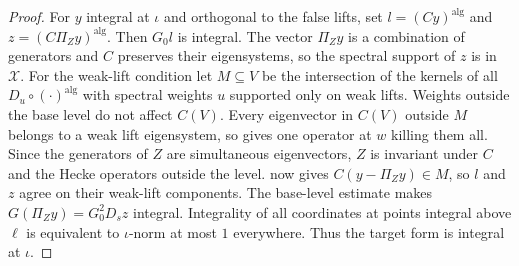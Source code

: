 \begin{proof}
For $y$ integral at $\iota$ and orthogonal to the false lifts, set $l=(Cy)^{\mathrm{alg}}$ and $z=(C\Pi_Zy)^{\mathrm{alg}}$. Then $G_0l$ is integral. The vector $\Pi_Zy$ is a combination of generators and $C$ preserves their eigensystems, so the spectral support of $z$ is in $\mathcal X$. For the weak-lift condition let $M\subseteq V$ be the intersection of the kernels of all $D_u\circ(\cdot)^{\mathrm{alg}}$ with spectral weights $u$ supported only on weak lifts. Weights outside the base level do not affect $C(V)$. Every eigenvector in $C(V)$ outside $M$ belongs to a weak lift eigensystem, so  gives one operator at $w$ killing them all. Since the generators of $Z$ are simultaneous eigenvectors, $Z$ is invariant under $C$ and the Hecke operators outside the level.  now gives $C(y-\Pi_Zy)\in M$, so $l$ and $z$ agree on their weak-lift components. The base-level estimate makes $G(\Pi_Zy)=G_0^2D_s z$ integral. Integrality of all coordinates at points integral above $\ell$ is equivalent to $\iota$-norm at most $1$ everywhere. Thus the target form is integral at $\iota$.
\end{proof}

